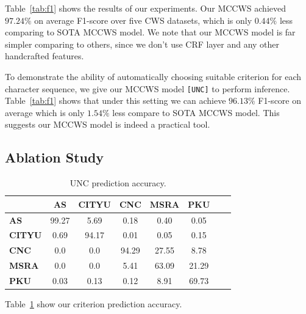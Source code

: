 \documentclass[11pt]{article}
\newcommand{\UNC}{\texttt{[UNC]}}
\begin{document}
Table~\ref{tab:f1} shows the results of our experiments.
Our MCCWS achieved \(97.24\%\) on average F1-score over five CWS datasets, which is only \(0.44\%\) less comparing to SOTA MCCWS model.
We note that our MCCWS model is far simpler comparing to others, since we don't use CRF layer and any other handcrafted features.

To demonstrate the ability of automatically choosing suitable criterion for each character sequence, we give our MCCWS model \UNC{} to perform inference.
Table~\ref{tab:f1} shows that under this setting we can achieve \(96.13\%\) F1-score on average which is only \(1.54\%\) less compare to SOTA MCCWS model.
This suggests our MCCWS model is indeed a practical tool.

\subsection{Ablation Study}

\begin{table}[t]
  \caption{UNC prediction accuracy.}
  \label{tab:acc}
  \centering
  \begin{tabular}{lccccccc}
    \hline
                   & \textbf{AS} & \textbf{CITYU} & \textbf{CNC} & \textbf{MSRA} & \textbf{PKU} \\
    \hline
    \textbf{AS}    & 99.27       & 5.69           & 0.18         & 0.40          & 0.05         \\
    \textbf{CITYU} & 0.69        & 94.17          & 0.01         & 0.05          & 0.15         \\
    \textbf{CNC}   & 0.0         & 0.0            & 94.29        & 27.55         & 8.78         \\
    \textbf{MSRA}  & 0.0         & 0.0            & 5.41         & 63.09         & 21.29        \\
    \textbf{PKU}   & 0.03        & 0.13           & 0.12         & 8.91          & 69.73        \\
    \hline
  \end{tabular}
\end{table}

Table~\ref{tab:acc} show our criterion prediction accuracy.
\end{document}
